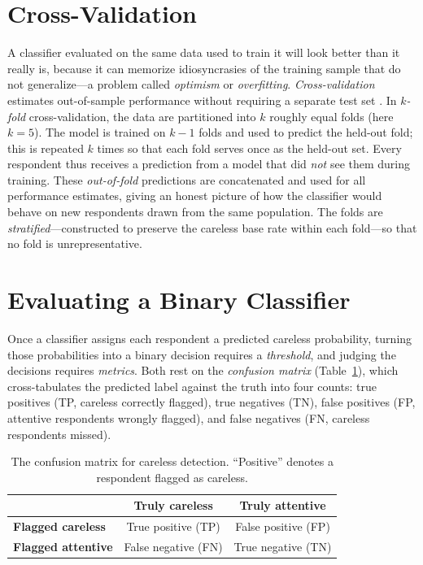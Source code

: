 \documentclass[doc,11pt,donotrepeattitle]{apa7}
\begin{document}
\section{Cross-Validation}
\label{sec:cv}

A classifier evaluated on the same data used to train it will look better than
it really is, because it can memorize idiosyncrasies of the training sample that
do not generalize---a problem called \emph{optimism} or \emph{overfitting}.
\emph{Cross-validation} estimates out-of-sample performance without requiring a
separate test set \parencite{stone1974cross, kohavi1995study}. In
\emph{$k$-fold} cross-validation, the data are partitioned into $k$ roughly
equal folds (here $k=5$). The model is trained on $k-1$ folds and used to
predict the held-out fold; this is repeated $k$ times so that each fold serves
once as the held-out set. Every respondent thus receives a prediction from a
model that did \emph{not} see them during training. These \emph{out-of-fold}
predictions are concatenated and used for all performance estimates, giving an
honest picture of how the classifier would behave on new respondents drawn from
the same population. The folds are \emph{stratified}---constructed to preserve
the careless base rate within each fold---so that no fold is unrepresentative.

\section{Evaluating a Binary Classifier}
\label{sec:metrics}

Once a classifier assigns each respondent a predicted careless probability,
turning those probabilities into a binary decision requires a \emph{threshold},
and judging the decisions requires \emph{metrics}. Both rest on the
\emph{confusion matrix} (Table~\ref{tab:confusion}), which cross-tabulates the
predicted label against the truth into four counts: true positives (TP, careless
correctly flagged), true negatives (TN), false positives (FP, attentive
respondents wrongly flagged), and false negatives (FN, careless respondents
missed).

\begin{table}[t]
\centering
\caption{The confusion matrix for careless detection. ``Positive'' denotes a
respondent flagged as careless.}
\label{tab:confusion}
\small
\begin{tabular}{l c c}
\toprule
 & \textbf{Truly careless} & \textbf{Truly attentive} \\
\midrule
\textbf{Flagged careless}  & True positive (TP)  & False positive (FP) \\
\textbf{Flagged attentive} & False negative (FN) & True negative (TN)  \\
\bottomrule
\end{tabular}
\end{table}
\end{document}
